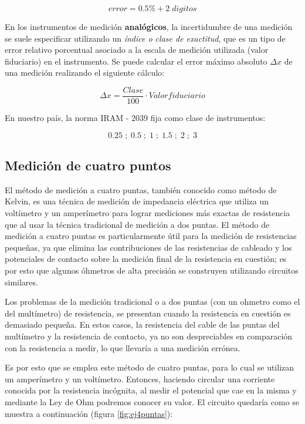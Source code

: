 \begin{equation}
    error = 0.5\% + 2\;digitos 
\end{equation}

En los instrumentos de medición \textbf{analógicos}, la incertidumbre de una medición se suele especificar utilizando un \textit{índice o clase de exactitud}, que es un tipo de error relativo porcentual asociado a la escala de medición utilizada (valor fiduciario) en el instrumento. Se puede calcular el error máximo absoluto $\Delta x$ de una medición realizando el siguiente cálculo:

\begin{equation}
    \Delta x = \frac{Clase}{100} \cdot Valor fiduciario
\end{equation}

En nuestro país, la norma IRAM - 2039 fija como clase de instrumentos: 

\begin{equation}
    0.25 \;;\; 0.5 \;;\; 1 \;;\; 1.5 \;;\; 2 \;;\; 3 
\end{equation}


\subsection{Medición de cuatro puntos}

El método de medición a cuatro puntas, también conocido como método de Kelvin, es una técnica de medición de impedancia eléctrica que utiliza un voltímetro y un amperímetro para lograr mediciones más exactas de resistencia que al usar la técnica tradicional de medición a dos puntas. El método de medición a cuatro puntas es particularmente útil para la medición de resistencias pequeñas, ya que elimina las contribuciones de las resistencias de cableado y los potenciales de contacto sobre la medición final de la resistencia en cuestión; es por esto que algunos óhmetros de alta precisión se construyen utilizando circuitos similares.

Los problemas de la medición tradicional o a dos puntas (con un ohmetro como el del multímetro) de resistencia, se presentan cuando la resistencia en cuestión es demasiado pequeña. En estos casos, la resistencia del cable de las puntas del multímetro y la resistencia de contacto, ya no son despreciables en comparación con la resistencia a medir, lo que llevaría a una medición errónea.

Es por esto que se emplea este método de cuatro puntas, para lo cual se utilizan un amperímetro y un voltímetro. Entonces, haciendo circular una corriente conocida por la resistencia incógnita, al medir el potencial que cae en la misma y mediante la Ley de Ohm podremos conocer su valor. El circuito quedaría como se muestra a continuación (figura \ref{fig:ej4puntas}):

